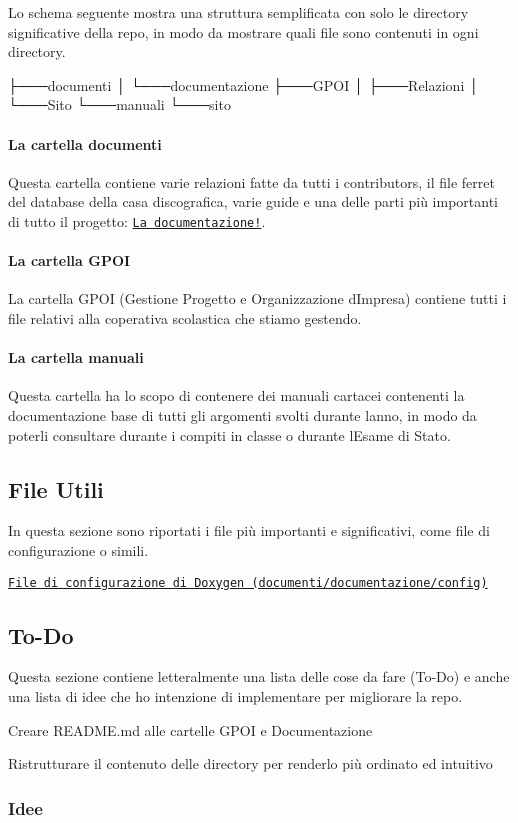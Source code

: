 Lo schema seguente mostra una struttura semplificata con solo le directory significative della repo, in modo da mostrare quali file sono contenuti in ogni directory. 
\begin{DoxyCode}
├───documenti
│   └───documentazione
├───GPOI
│   ├───Relazioni
│   └───Sito
└───manuali
    └───sito
\end{DoxyCode}
 \paragraph*{La cartella documenti}

Questa cartella contiene varie relazioni fatte da tutti i contributors, il file ferret del database della casa discografica, varie guide e una delle parti più importanti di tutto il progetto\+: \href{#documentazione}{\tt La documentazione!}. \paragraph*{La cartella G\+P\+OI}

La cartella G\+P\+OI (Gestione Progetto e Organizzazione d\textquotesingle{}Impresa) contiene tutti i file relativi alla coperativa scolastica che stiamo gestendo. \paragraph*{La cartella manuali}

Questa cartella ha lo scopo di contenere dei manuali cartacei contenenti la documentazione base di tutti gli argomenti svolti durante l\textquotesingle{}anno, in modo da poterli consultare durante i compiti in classe o durante l\textquotesingle{}Esame di Stato. \subsection*{File Utili}

In questa sezione sono riportati i file più importanti e significativi, come file di configurazione o simili.
\begin{DoxyItemize}
\item \href{documenti/documentazione/config}{\tt File di configurazione di Doxygen (documenti/documentazione/config)} \subsection*{To-\/\+Do}
\end{DoxyItemize}

Questa sezione contiene letteralmente una lista delle cose da fare (To-\/\+Do) e anche una lista di idee che ho intenzione di implementare per migliorare la repo.
\begin{DoxyItemize}
\item Creare R\+E\+A\+D\+M\+E.\+md alle cartelle G\+P\+OI e Documentazione
\item Ristrutturare il contenuto delle directory per renderlo più ordinato ed intuitivo \subsubsection*{Idee}
\end{DoxyItemize}


